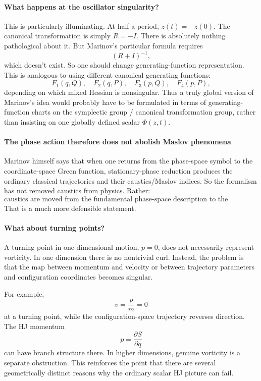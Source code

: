 \paragraph{ What happens at the oscillator singularity?}
This is particularly illuminating.
At half a period, $ z(t)=-z(0)$. 
The canonical transformation is simply $ R=-I$. 
There is absolutely nothing pathological about it.
But Marinov's particular formula requires $$ (R+I)^{-1}, $$
which doesn't exist.
So one should change generating-function representation.
This is analogous to using different canonical generating functions:
$$ F_1(q,Q),\quad F_2(q,P),\quad F_3(p,Q),\quad F_4(p,P), $$
depending on which mixed Hessian is nonsingular.
Thus a truly global version of Marinov's idea would probably have to be
formulated in terms of generating-function charts on the symplectic group /
canonical transformation group, rather than insisting on one globally defined
scalar \(\Phi(z,t)\).

\paragraph{The phase action therefore does not abolish Maslov phenomena}
Marinov himself says that when one returns from the phase-space symbol to the
coordinate-space Green function, stationary-phase reduction produces the
ordinary classical trajectories and their caustics/Maslov indices.
So the formalism has not removed caustics from physics.
Rather:
$$ \boxed{ \text{caustics are moved from the fundamental phase-space description to the projection/Legendre transform to configuration space.} } $$
That is a much more defensible statement.

 \paragraph{What about turning points?}
A turning point in one-dimensional motion, $ p=0$, does not necessarily
represent vorticity. In one dimension there is no nontrivial curl.
Instead, the problem is that the map between momentum and velocity or between
trajectory parameters and configuration coordinates becomes singular.

For example, $$ v=\frac{p}{m}=0 $$
at a turning point, while the configuration-space trajectory reverses
direction.
The HJ momentum
$$ p=\frac{\partial S}{\partial q} $$
can have branch structure there.
In higher dimensions, genuine vorticity is a separate obstruction.
This reinforces the point that there are several geometrically distinct reasons
why the ordinary scalar HJ picture can fail.

